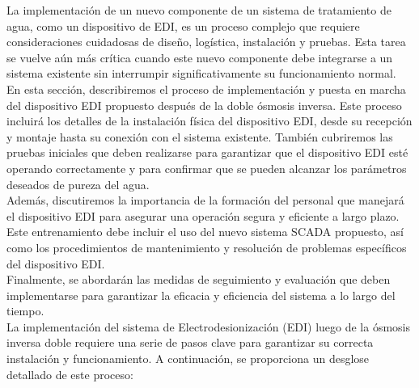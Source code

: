 La implementación de un nuevo componente de un sistema de tratamiento de agua,
como un dispositivo de EDI, es un proceso complejo que requiere consideraciones
cuidadosas de diseño, logística, instalación y pruebas. Esta tarea se vuelve
aún más crítica cuando este nuevo componente debe integrarse a un sistema
existente sin interrumpir significativamente su funcionamiento normal.\\

En esta sección, describiremos el proceso de implementación y puesta en marcha del dispositivo EDI propuesto después de la doble ósmosis inversa. Este proceso incluirá los detalles de la instalación física del dispositivo EDI, desde su recepción y montaje hasta su conexión con el sistema existente. También cubriremos las pruebas iniciales que deben realizarse para garantizar que el dispositivo EDI esté operando correctamente y para confirmar que se pueden alcanzar los parámetros deseados de pureza del agua.\\

Además, discutiremos la importancia de la formación del personal que manejará el dispositivo EDI para asegurar una operación segura y eficiente a largo plazo. Este entrenamiento debe incluir el uso del nuevo sistema SCADA propuesto, así como los procedimientos de mantenimiento y resolución de problemas específicos del dispositivo EDI. \\

Finalmente, se abordarán las medidas de seguimiento y evaluación que deben implementarse para garantizar la eficacia y eficiencia del sistema a lo largo del tiempo.\\

La implementación del sistema de Electrodesionización (EDI) luego de la ósmosis inversa doble requiere una serie de pasos clave para garantizar su correcta instalación y funcionamiento. A continuación, se proporciona un desglose detallado de este proceso:

